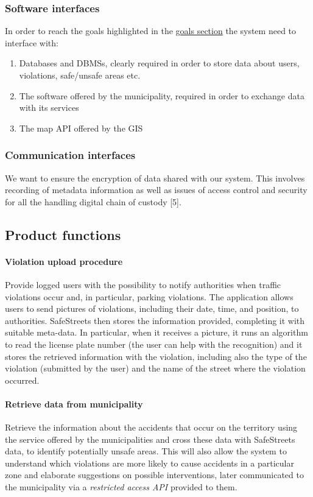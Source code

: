 \subsubsection{Software interfaces}
	In order to reach the goals highlighted in the \hyperref[sec:goals]{goals section} the system need to interface with:
	\begin{enumerate}
		\item Databases and DBMSs, clearly required in order to store data about users, violations, safe/unsafe areas etc.
		\item The software offered by the municipality, required in order to exchange data with its services
		\item The map API offered by the GIS
	\end{enumerate}
	
\subsubsection{Communication interfaces}
	We want to ensure the encryption of data shared with our system. This involves recording of metadata information as well as issues of access control and security for all the handling digital chain of custody [5].
\subsection{Product functions}
\paragraph{Violation upload procedure} 
Provide logged users with the possibility to notify authorities when traffic violations occur and, in particular, parking violations. The application allows users to send pictures of violations, including their date, time, and position, to authorities. 
SafeStreets then stores the information provided, completing it with suitable meta-­data. In particular, when it receives a picture, it runs an algorithm to read the license plate number (the user can help with the recognition) and it stores the retrieved information with the violation, including also the type of the violation (submitted by the user) and the name of the street where the violation occurred.

\paragraph{Retrieve data from municipality}
Retrieve the information about the accidents that occur on the territory using the service offered by the municipalities and cross these data with SafeStreets data, to identify potentially unsafe areas. This will also allow the system to understand which violations are more likely to cause accidents in a particular zone and elaborate suggestions on possible interventions, later communicated to the municipality via a \emph{restricted access API} provided to them.

